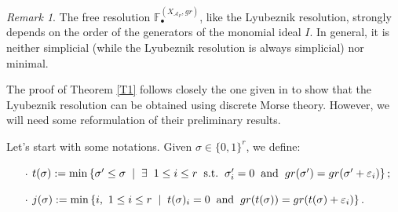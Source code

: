 \documentclass[12pt]{amsart}
\theoremstyle{definition}
\theoremstyle{remark}
\newtheorem{remark}[theorem]{Remark}
\numberwithin{equation}{section}
\newcommand{\cA}{{\mathcal A}}
\newcommand{\phil}[1]{{\color{red} \sf $\star\star$ Philippe: [#1]}}
\begin{document}

\begin{remark}
The free resolution $\mathbb{F}_{\bullet}^{(X_{\cA_P},gr)}$, like the Lyubeznik resolution, strongly depends on the order of the
generators of the monomial ideal $I$. %
In general, it is neither simplicial (while the Lyubeznik resolution is always simplicial) nor minimal.
\end{remark}

The proof of Theorem \ref{T1} follows closely the one given in
\cite[\S3]{BW} to show that the Lyubeznik resolution can be obtained
using discrete Morse theory. However, we will need some reformulation of their preliminary results.

\vskip 2mm


Let's start with some notations. Given  $\sigma \in \{0,1\}^r$, we define:

\vskip 2mm

\begin{itemize}
 \item[$\cdot$] $t(\sigma):= {\rm min}\left\{ \sigma' \leq \sigma \hskip 2mm | \hskip 2mm \exists \hskip 2mm 1\leq i \leq r
 \hskip 2mm {\rm s.t.} \hskip 2mm  \sigma'_i=0 \hskip 2mm {\rm and} \hskip 2mm gr(\sigma')=gr(\sigma' + \varepsilon_i) \right\};$

 \vskip 2mm

 \item[$\cdot$] $j(\sigma):= {\rm min}\left\{ i ,\ 1\leq i\leq r\hskip 2mm | \hskip 2mm  t(\sigma)_i=0 \hskip 2mm {\rm and} \hskip 2mm
 gr(t(\sigma))=gr(t(\sigma) + \varepsilon_i) \right\}.$
\end{itemize}
\end{document}
